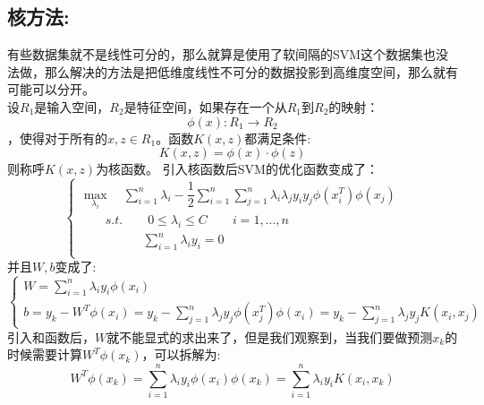 \documentclass[withoutpreface,bwprint]{cumcmthesis} %
\begin{document}
  \subsection{\Large 核方法:}
  	有些数据集就不是线性可分的，那么就算是使用了软间隔的SVM这个数据集也没法做，那么解决的方法是把低维度线性不可分的数据投影到高维度空间，那么就有可能可以分开。\\
  	设$R_1$是输入空间，$R_2$是特征空间，如果存在一个从$R_1$到$R_2$的映射：
  	\begin{equation}
  		\phi(x):R_1 \to R_2
  	\end{equation}，使得对于所有的$x,z \in R_1$。函数$K(x,z)$都满足条件:
  \begin{equation}
  		K(x,z)=\phi(x) \cdot \phi(z)
  \end{equation}
  	则称呼$K(x,z)$为核函数。
  	引入核函数后SVM的优化函数变成了：
  	\begin{equation}
  			\begin{cases}
  			\mathop{max} \limits_{\lambda_i} \quad \sum_{i=1}^{n}\lambda_i -\dfrac{1}{2} \sum_{i=1}^{n}\sum_{j=1}^{n} \lambda_i \lambda_j y_i y_j \phi(x_i^T) \phi( x_j)
  			\\
  			\quad \quad s.t.\quad \quad  0 \leq \lambda_i \leq C \quad \quad i=1,\ldots,n \\
  			\quad \quad \quad \quad \quad \sum_{i=1}^{n} \lambda_i y_i=0\\
  		\end{cases}
  	\end{equation}
  	并且$W,b$变成了:
  	\begin{equation}
  		\begin{cases}
  			W=\sum_{i=1}^{n}\lambda_i y_i \phi(x_i)\\
  			b=y_k-W^T\phi(x_i)=y_k-\sum_{j=1}^{n}\lambda_j y_j \phi(x_j^T) \phi(x_i)=y_k-\sum_{j=1}^{n}\lambda_j y_j K(x_i,x_j) 
  		\end{cases}
  	\end{equation}
  	引入和函数后，$W$就不能显式的求出来了，但是我们观察到，当我们要做预测$x_k$的时候需要计算$W^T\phi(x_k)$，可以拆解为:
  	\begin{equation}
  		W^T\phi(x_k)=\sum_{i=1}^{n}\lambda_i y_i \phi(x_i) \phi(x_k) =\sum_{i=1}^{n}\lambda_iy_i K(x_i,x_k)
  	\end{equation}
  	
  	
  	
  	
 
 
 	
 	
 	
 	
	
	
	
	
	
	
	
\end{document}
